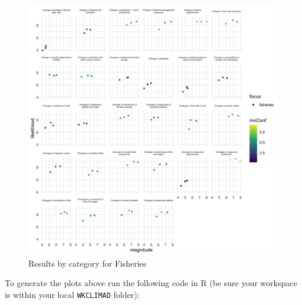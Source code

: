 \documentclass[
]{article}
\begin{document}
\begin{figure}
\centering
\includegraphics[width=1\textwidth,height=\textheight]{Figs/Fig3.png}
\caption{Results by category for Fisheries}
\end{figure}

To generate the plots above run the following code in R (be sure your
workspace is within your local \texttt{WKCLIMAD} folder):
\end{document}
